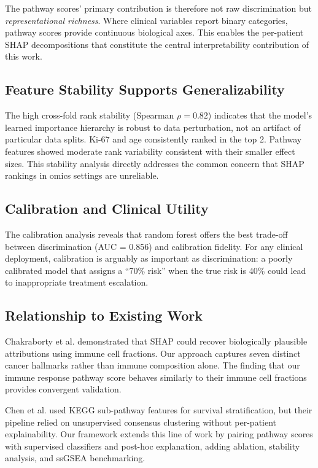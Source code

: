 \documentclass[11pt]{article}
\begin{document}
The pathway scores' primary contribution is therefore not raw discrimination but \textit{representational richness}. Where clinical variables report binary categories, pathway scores provide continuous biological axes. This enables the per-patient SHAP decompositions that constitute the central interpretability contribution of this work.

\subsection{Feature Stability Supports Generalizability}

The high cross-fold rank stability (Spearman $\rho = 0.82$) indicates that the model's learned importance hierarchy is robust to data perturbation, not an artifact of particular data splits. Ki-67 and age consistently ranked in the top 2. Pathway features showed moderate rank variability consistent with their smaller effect sizes. This stability analysis directly addresses the common concern that SHAP rankings in omics settings are unreliable.

\subsection{Calibration and Clinical Utility}

The calibration analysis reveals that random forest offers the best trade-off between discrimination (AUC = 0.856) and calibration fidelity. For any clinical deployment, calibration is arguably as important as discrimination: a poorly calibrated model that assigns a ``70\% risk'' when the true risk is 40\% could lead to inappropriate treatment escalation.

\subsection{Relationship to Existing Work}

Chakraborty et al. \citep{chakraborty2021} demonstrated that SHAP could recover biologically plausible attributions using immune cell fractions. Our approach captures seven distinct cancer hallmarks rather than immune composition alone. The finding that our immune response pathway score behaves similarly to their immune cell fractions provides convergent validation.

Chen et al. \citep{chen2021pathway} used KEGG sub-pathway features for survival stratification, but their pipeline relied on unsupervised consensus clustering without per-patient explainability. Our framework extends this line of work by pairing pathway scores with supervised classifiers and post-hoc explanation, adding ablation, stability analysis, and ssGSEA benchmarking.
\end{document}
